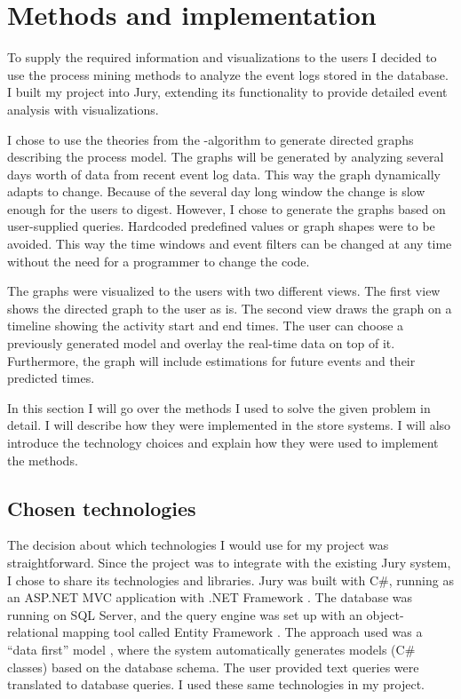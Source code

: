 
\clearpage
\section{Methods and implementation}

To supply the required information and visualizations to the users I decided to use the process mining methods to analyze the event logs stored in the database.
I built my project into Jury, extending its functionality to provide detailed event analysis with visualizations.

I chose to use the theories from the \textalpha-algorithm to generate directed graphs describing the process model.
The graphs will be generated by analyzing several days worth of data from recent event log data. 
This way the graph dynamically adapts to change. 
Because of the several day long window the change is slow enough for the users to digest. 
However, I chose to generate the graphs based on user-supplied queries.
Hardcoded predefined values or graph shapes were to be avoided.
This way the time windows and event filters can be changed at any time without the need for a programmer to change the code.

The graphs were visualized to the users with two different views. 
The first view shows the directed graph to the user as is. 
The second view draws the graph on a timeline showing the activity start and end times.
The user can choose a previously generated model and overlay the real-time data on top of it.
Furthermore, the graph will include estimations for future events and their predicted times.

In this section I will go over the methods I used to solve the given problem in detail.
I will describe how they were implemented in the store systems.
I will also introduce the technology choices and explain how they were used to implement the methods.

\subsection{Chosen technologies}

The decision about which technologies I would use for my project was straightforward.
Since the project was to integrate with the existing Jury system, I chose to share its technologies and libraries.
Jury was built with C\#, running as an ASP.NET MVC application with .NET Framework \cite{aspnetmvc}.
The database was running on SQL Server, and the query engine was set up with an object-relational mapping tool called Entity Framework \cite{entityframework}.
The approach used was a ``data first'' model \cite{efdatafirst}, where the system automatically generates models (C\# classes) based on the database schema.
The user provided text queries were translated to database queries.
I used these same technologies in my project.

